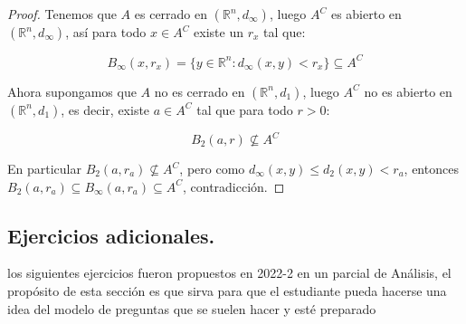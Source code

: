 \begin{itemize}[leftmargin=*]
   \begin{proof}
         Tenemos que $A$ es cerrado en $(\mathbb{R}^n,d_{\infty})$, luego $A^C$ es abierto en $(\mathbb{R}^n,d_{\infty})$, así para todo $x\in A^C$ existe un $r_x$ tal que:

         $$B_{\infty}(x,r_x)=\{y\in \mathbb{R}^n: d_{\infty}(x,y)<r_x\}\subseteq A^C$$

         Ahora supongamos que $A$ no es cerrado en $(\mathbb{R}^n,d_1)$, luego $A^C$ no es abierto en $(\mathbb{R}^n,d_1)$, es decir, existe $a \in A^C$ tal que para todo $r>0$:

         $$B_2(a,r)\not \subseteq A^C$$

         En particular $B_2(a,r_a)\not \subseteq A^C$, pero como $d_{\infty}(x,y)\leq d_2(x,y)<r_a$, entonces $B_2(a,r_a)\subseteq B_{\infty}(a,r_a)\subseteq A^C$, contradicción.
         
    \end{proof}
    
   

    
\end{itemize}
\vspace{0.3cm}
 \subsection{Ejercicios adicionales.}
    
\begin{note}
 los siguientes ejercicios fueron propuestos en 2022-2 en un parcial de Análisis, el propósito de esta sección es que sirva para que el estudiante pueda hacerse una idea del modelo de preguntas que se suelen hacer y esté preparado
\end{note}


